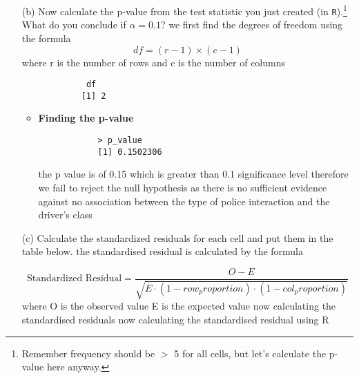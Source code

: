 \documentclass[12pt,letterpaper]{article}
\begin{document}
\begin{enumerate}
\begin{itemize}
	\end{itemize}

	\vspace{0.7cm}
	\item [(b)]
	Now calculate the p-value from the test statistic you just created (in \texttt{R}).\footnote{Remember frequency should be $>$ 5 for all cells, but let's calculate the p-value here anyway.}  What do you conclude if $\alpha = 0.1$?
	we first find the degrees of freedom using the formula
	\[
	df = (r - 1) \times (c - 1)
	\]
	where r is the number of rows and c is the number of columns
	
		\begin{verbatim}
			 df
			[1] 2
		\end{verbatim}
		\begin{itemize}
		\item \textbf{Finding the p-value}
		
		\begin{verbatim}
			> p_value
			[1] 0.1502306
		\end{verbatim}		
	
	the p value is of 0.15 which is greater than 0.1 significance level therefore we fail to reject the null hypothesis as there is no sufficient evidence against no association between the type of police interaction and the driver's class
		\end{itemize}
	\newpage
	\item [(c)] Calculate the standardized residuals for each cell and put them in the table below.
	\vspace{1cm}
	the standardised residual is calculated by the formula
	
	\[
	\text{Standardized Residual} = \frac{O - E}{\sqrt{E \cdot (1 - row_proportion) \cdot (1 - col_proportion)}}
	\]
	where O is the observed value E is the expected value 
	now calculating the standardised residuals 
	now calculating the standardised residual using R
	
	
	
	
\end{enumerate}
	
\end{document}
